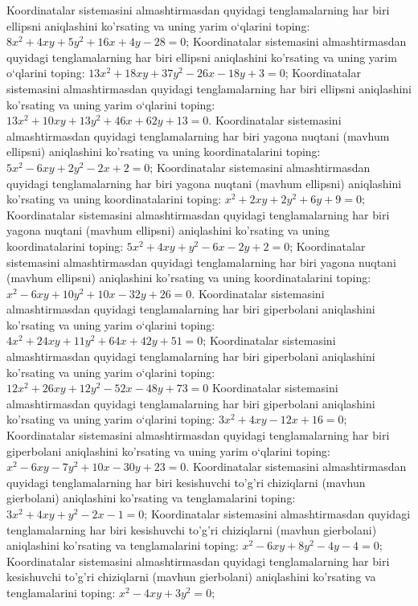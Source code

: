 Koordinatalar sistemasini almashtirmasdan quyidagi tenglamalarning har biri ellipsni aniqlashini ko'rsating va uning yarim o‘qlarini toping: $8 x^2+4 x y+5 y^2+16 x+4 y-28=0$;
Koordinatalar sistemasini almashtirmasdan quyidagi tenglamalarning har biri ellipsni aniqlashini ko'rsating va uning yarim o‘qlarini toping: $13 x^2+18 x y+37 y^2-26 x-18 y+3=0$;
Koordinatalar sistemasini almashtirmasdan quyidagi tenglamalarning har biri ellipsni aniqlashini ko'rsating va uning yarim o‘qlarini toping: $13 x^2+10 x y+13 y^2+46 x+62 y+13=0$.
Koordinatalar sistemasini almashtirmasdan quyidagi tenglamalarning har biri yagona nuqtani (mavhum ellipsni) aniqlashini ko'rsating va uning koordinatalarini toping: $5 x^2-6 x y+2 y^2-2 x+2=0$;
Koordinatalar sistemasini almashtirmasdan quyidagi tenglamalarning har biri yagona nuqtani (mavhum ellipsni) aniqlashini ko'rsating va uning koordinatalarini toping: $x^2+2 x y+2 y^2+6 y+9=0$;
Koordinatalar sistemasini almashtirmasdan quyidagi tenglamalarning har biri yagona nuqtani (mavhum ellipsni) aniqlashini ko'rsating va uning koordinatalarini toping: $5 x^2+4 x y+y^2-6 x-2 y+2=0$;
Koordinatalar sistemasini almashtirmasdan quyidagi tenglamalarning har biri yagona nuqtani (mavhum ellipsni) aniqlashini ko'rsating va uning koordinatalarini toping: $x^2-6 x y+10 y^2+10 x-32 y+26=0$.
Koordinatalar sistemasini almashtirmasdan quyidagi tenglamalarning har biri giperbolani aniqlashini ko'rsating va uning yarim o‘qlarini toping: $4 x^2+24 x y+11 y^2+64 x+42 y+51=0$;
Koordinatalar sistemasini almashtirmasdan quyidagi tenglamalarning har biri giperbolani aniqlashini ko'rsating va uning yarim o‘qlarini toping: $12 x^2+26 x y+12 y^2-52 x-48 y+73=0$
Koordinatalar sistemasini almashtirmasdan quyidagi tenglamalarning har biri giperbolani aniqlashini ko'rsating va uning yarim o‘qlarini toping: $3 x^2+4 x y-12 x+16=0$;
Koordinatalar sistemasini almashtirmasdan quyidagi tenglamalarning har biri giperbolani aniqlashini ko'rsating va uning yarim o‘qlarini toping: $x^2-6 x y-7 y^2+10 x-30 y+23=0$.
Koordinatalar sistemasini almashtirmasdan quyidagi tenglamalarning har biri kesishuvchi to'g'ri chiziqlarni (mavhun gierbolani) aniqlashini ko'rsating va tenglamalarini toping: $3 x^2+4 x y+y^2-2 x-1=0$;
Koordinatalar sistemasini almashtirmasdan quyidagi tenglamalarning har biri kesishuvchi to'g'ri chiziqlarni (mavhun gierbolani) aniqlashini ko'rsating va tenglamalarini toping: $x^2-6 x y+8 y^2-4 y-4=0$;
Koordinatalar sistemasini almashtirmasdan quyidagi tenglamalarning har biri kesishuvchi to'g'ri chiziqlarni (mavhun gierbolani) aniqlashini ko'rsating va tenglamalarini toping: $x^2-4 x y+3 y^2=0$;
